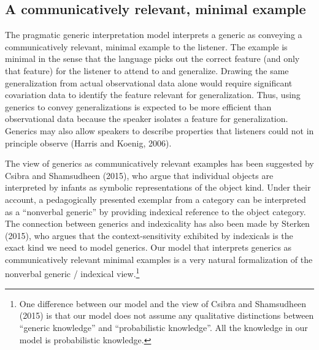 \documentclass[floatsintext,doc]{apa6}
\let\rmarkdownfootnote\footnote%
\def\footnote{\protect\rmarkdownfootnote}
\begin{document}
\subsection{A communicatively relevant, minimal example}

The pragmatic generic interpretation model interprets a generic as conveying a communicatively relevant, minimal example to the listener. 
The example is minimal in the sense that the language picks out the correct feature (and only that feature) for the listener to attend to and generalize. 
Drawing the same generalization from actual observational data alone would require significant covariation data to identify the feature relevant for generalization. 
Thus, using generics to convey generalizations is expected to be more efficient than observational data because the speaker isolates a feature for generalization. 
Generics may also allow speakers to describe properties that listeners could not in principle observe (Harris and Koenig, 2006). 

The view of generics as communicatively relevant examples has been suggested by Csibra and Shamsudheen (2015), who argue that individual objects are interpreted by infants as symbolic representations of the object kind.
Under their account, a pedagogically presented exemplar from a category can be interpreted as a \enquote{nonverbal generic} by providing indexical reference to the object category.
The connection between generics and indexicality has also been made by Sterken (2015), who argues that the context-sensitivity exhibited by indexicals is the exact kind we need to model generics.
Our model that interprets generics as communicatively relevant minimal examples is a very natural formalization of the nonverbal generic / indexical view.\footnote{
	One difference between our model and the view of Csibra and Shamsudheen (2015) is that our model does not assume any qualitative distinctions between ``generic knowledge'' and ``probabilistic knowledge''. All the knowledge in our model is probabilistic knowledge. 
	}
\end{document}
